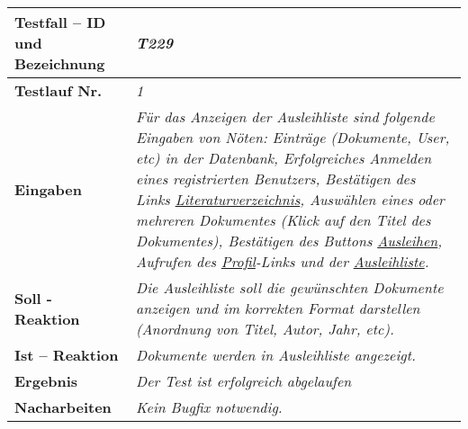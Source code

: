 \begin{longtable}{|p{5cm}|p{10cm}|}
\hline
\textbf{Testfall -- ID und Bezeichnung} & \textit{T229} \\
\hline
\textbf{Testlauf Nr.} & \textit{1} \\
\hline
\textbf{Eingaben} & \textit{Für das Anzeigen der Ausleihliste sind folgende 
Eingaben von Nöten: Einträge (Dokumente, User, etc) in der Datenbank, 
Erfolgreiches Anmelden eines registrierten Benutzers, Bestätigen des Links 
\uline{Literaturverzeichnis}, Auswählen eines oder mehreren Dokumentes 
(Klick auf den Titel des Dokumentes), Bestätigen des Buttons \uline{Ausleihen},   
Aufrufen des \uline{Profil}-Links und der \uline{Ausleihliste}.   
   } \\
\hline
\textbf{Soll - Reaktion} & \textit{Die Ausleihliste soll die gewünschten
Dokumente anzeigen und im korrekten Format darstellen (Anordnung von Titel, 
Autor, Jahr, etc). } \\
\hline
\textbf{Ist -- Reaktion} & \textit{Dokumente werden in Ausleihliste angezeigt.} \\
\hline
\textbf{Ergebnis} & \textit{Der Test ist erfolgreich abgelaufen} \\
\hline
\textbf{Nacharbeiten } & \textit{Kein Bugfix notwendig.} \\
\hline
\end{longtable}

